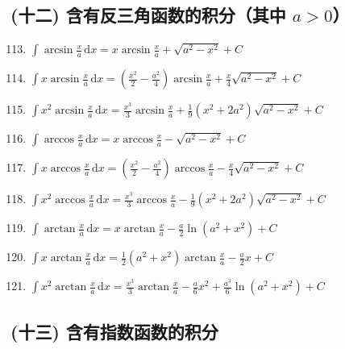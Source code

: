 \subsection*{(十二) 含有反三角函数的积分（其中 $a > 0$）}

\begin{enumerate}
    \setcounter{enumi}{112}
    \item $\displaystyle \int \arcsin \frac{x}{a} \, \mathrm{d}x = x \arcsin \frac{x}{a} + \sqrt{a^2 - x^2} + C$
    \item $\displaystyle \int x \arcsin \frac{x}{a} \, \mathrm{d}x = \left( \frac{x^2}{2} - \frac{a^2}{4} \right) \arcsin \frac{x}{a} + \frac{x}{4} \sqrt{a^2 - x^2} + C$
    \item $\displaystyle \int x^2 \arcsin \frac{x}{a} \, \mathrm{d}x = \frac{x^3}{3} \arcsin \frac{x}{a} + \frac{1}{9} (x^2 + 2a^2) \sqrt{a^2 - x^2} + C$
    \item $\displaystyle \int \arccos \frac{x}{a} \, \mathrm{d}x = x \arccos \frac{x}{a} - \sqrt{a^2 - x^2} + C$
    \item $\displaystyle \int x \arccos \frac{x}{a} \, \mathrm{d}x = \left( \frac{x^2}{2} - \frac{a^2}{4} \right) \arccos \frac{x}{a} - \frac{x}{4} \sqrt{a^2 - x^2} + C$
    \item $\displaystyle \int x^2 \arccos \frac{x}{a} \, \mathrm{d}x = \frac{x^3}{3} \arccos \frac{x}{a} - \frac{1}{9} (x^2 + 2a^2) \sqrt{a^2 - x^2} + C$
    \item $\displaystyle \int \arctan \frac{x}{a} \, \mathrm{d}x = x \arctan \frac{x}{a} - \frac{a}{2} \ln(a^2 + x^2) + C$
    \item $\displaystyle \int x \arctan \frac{x}{a} \, \mathrm{d}x = \frac{1}{2} (a^2 + x^2) \arctan \frac{x}{a} - \frac{a}{2} x + C$
    \item $\displaystyle \int x^2 \arctan \frac{x}{a} \, \mathrm{d}x = \frac{x^3}{3} \arctan \frac{x}{a} - \frac{a}{6} x^2 + \frac{a^3}{6} \ln(a^2 + x^2) + C$
\end{enumerate}

\subsection*{(十三) 含有指数函数的积分}

